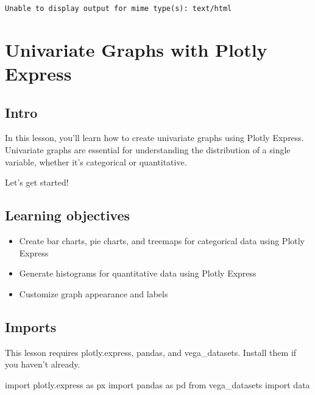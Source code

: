 \documentclass[
  letterpaper,
  DIV=11,
  numbers=noendperiod]{scrreprt}
\newenvironment{Shaded}{\begin{snugshade}}{\end{snugshade}}
\newcommand{\ImportTok}[1]{\textcolor[rgb]{0.00,0.46,0.62}{#1}}
\newcommand{\NormalTok}[1]{\textcolor[rgb]{0.00,0.23,0.31}{#1}}
\providecommand{\tightlist}{%
  \setlength{\itemsep}{0pt}\setlength{\parskip}{0pt}}\usepackage{longtable,booktabs,array}
\begin{document}
\begin{verbatim}
Unable to display output for mime type(s): text/html
\end{verbatim}

\chapter{Univariate Graphs with Plotly
Express}\label{univariate-graphs-with-plotly-express}

\section{Intro}\label{intro-1}

In this lesson, you'll learn how to create univariate graphs using
Plotly Express. Univariate graphs are essential for understanding the
distribution of a single variable, whether it's categorical or
quantitative.

Let's get started!

\section{Learning objectives}\label{learning-objectives-5}

\begin{itemize}
\tightlist
\item
  Create bar charts, pie charts, and treemaps for categorical data using
  Plotly Express
\item
  Generate histograms for quantitative data using Plotly Express
\item
  Customize graph appearance and labels
\end{itemize}

\section{Imports}\label{imports-1}

This lesson requires plotly.express, pandas, and vega\_datasets. Install
them if you haven't already.

\begin{Shaded}
\begin{Highlighting}[]
\ImportTok{import}\NormalTok{ plotly.express }\ImportTok{as}\NormalTok{ px}
\ImportTok{import}\NormalTok{ pandas }\ImportTok{as}\NormalTok{ pd}
\ImportTok{from}\NormalTok{ vega\_datasets }\ImportTok{import}\NormalTok{ data}
\end{Highlighting}
\end{Shaded}
\end{document}
